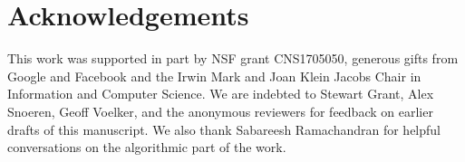 \documentclass[sigconf]{acmart}
\begin{document}




\maketitle




% 







\section*{Acknowledgements}

This work was supported in part by NSF grant CNS1705050, generous gifts from
Google and Facebook and the Irwin Mark and Joan Klein Jacobs Chair in
Information and Computer Science.  We are indebted to Stewart Grant, Alex
Snoeren, Geoff Voelker, and the anonymous reviewers for feedback on earlier
drafts of this manuscript. We also thank Sabareesh Ramachandran for helpful
conversations on the algorithmic part of the work.



\end{document}
